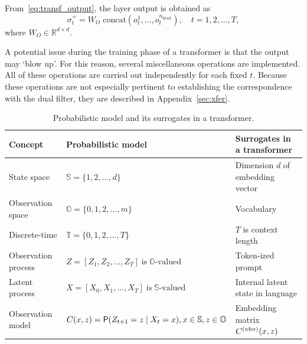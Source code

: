 \documentclass[twoside,11pt]{article}
\def\Re{\mathbb{R}}
\newcommand{\field}[1]{\mathbb{#1}}
\def\Re{\field{R}}
\def\bS{\begin{slide}}
\def\Re{\mathbb{R}}
\renewcommand{\Re}{\mathbb{R}}
\def\bS{\mathbb{S}}
\def\bO{\mathbb{O}}
\def\sP{{\sf P}}
\def\xfer{{\text{\rm (xfer)}}}
\begin{document}

  
From~\eqref{eq:transf_output}, the
layer output is obtained as 
\begin{equation*}
\sigma^+_t = W_O \; \text{concat}(o_t^1, \hdots, o_t^{n_{\text{head}}}),\quad t=1,2,\hdots,T,
\end{equation*}
where $W_O \in \Re^{d\times d}$.

A potential issue during the training phase of a transformer is that the output may `blow up'.  For this reason, several miscellaneous operations are implemented.  All of these operations are
carried out independently for each fixed $t$.  Because these
operations are not especially pertinent to establishing the
correspondence with the dual filter, they are described in
Appendix~\ref{sec:xfer}.



\begin{table}[t]
  \centering
  \begin{tabularx}{\textwidth}{l l l}
    \toprule
    \textbf{Concept} & \textbf{Probabilistic model} & \textbf{Surrogates in a transformer} \\
    \midrule
    State space & \( \bS = \{1,2,\ldots,d\} \) & Dimension $d$ of embedding vector \\
    Observation space & \( \bO = \{0,1,2,\ldots,m\} \) & Vocabulary \\
    Discrete-time & \( \mathbb{T} = \{0,1,2,\ldots,T\} \) & $T$ is context length \\
    Observation process & \( Z= [Z_1, Z_2, \ldots, Z_T] \;\text{is}\; \bO\text{-valued}\) & Token-ized prompt \\
    Latent process & \( X = [X_0, X_1, \ldots, X_T]\;\text{is}\; \bS\text{-valued}\) & Internal latent state in language\\
    Observation model & \( C(x,z)=\sP(Z_{t+1} = z \mid X_t = x),x
                        \in\bS,z\in \bO\) & Embedding matrix \( C^\xfer(x, z) \) \\
    \bottomrule
  \end{tabularx}
  \vspace*{-10pt}
  \caption{Probabilistic model and its surrogates in a transformer.}
  \label{tab:correspondence_model}
\end{table}
\end{document}
